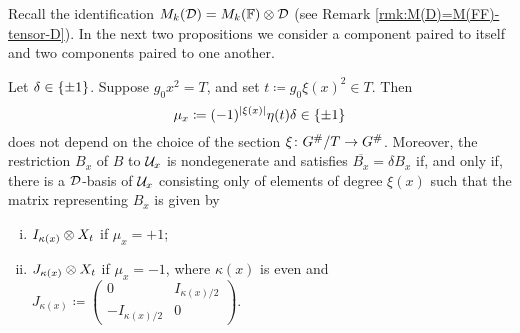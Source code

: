 Recall the identification $M_k (\mathcal{D}) = M_k(\mathbb{F}) \otimes \mathcal{D}$ (see Remark \ref{rmk:M(D)=M(FF)-tensor-D}).
In the next two propositions we consider a component paired to itself and two components paired to one another.


\begin{prop}\label{prop:self-dual-components}
	Let $\delta \in \{ \pm 1 \}$.
	Suppose $g_0 x^2 = T$,  and  set $t \coloneqq g_0\xi(x)^2 \in T$.
	Then
	\begin{equation}\label{eq:mu_x}
		\mu_{x} \coloneqq (-1)^{|\xi(x)|} \eta(t) \delta \in \{ \pm 1 \}
	\end{equation}
	does not depend on the choice of the section $\xi\colon G^\#/T \to G^\#$.
	Moreover, the restriction $B_x$ of $B$ to $\mathcal U_x$ is nondegenerate and satisfies $\overline{B_x} = \delta B_x$ if, and only if, there is a $\mathcal{D}$-basis of $\mathcal U_{x}$ consisting only of elements of degree $\xi(x)$ such that the matrix representing $B_x$ is given by
	\begin{enumerate}[(i)]
		\item $I_{\kappa(x)} \otimes X_t$ if $\mu_x = +1$;
		\item $J_{\kappa(x)} \otimes X_t$ if $\mu_{x} = -1$, where $\kappa (x)$ is even and $J_{\kappa(x)} \coloneqq \begin{pmatrix}
				      0                & I_{\kappa(x)/2} \\
				      -I_{\kappa(x)/2} & 0
			      \end{pmatrix}$.
	\end{enumerate}
\end{prop}

